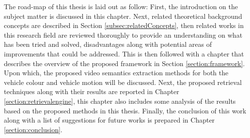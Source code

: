 The road-map of this thesis is laid out as follow: First, the introduction on the subject matter is discussed in this chapter. Next, related theoretical background concepts are described in Section \ref{subsec:relatedConcepts}, then related works in this research field are reviewed thoroughly to provide an understanding on what has been tried and solved, disadvantages along with potential areas of improvements that could be addressed. This is then followed with a chapter that describes the overview of the proposed framework in Section \ref{section:framework}. Upon which, the proposed video semantics extraction methods for both the vehicle colour and vehicle motion will be discussed. Next, the proposed retrieval techniques along with their results are reported in Chapter \ref{section:retrievalengine}, this chapter also includes some analysis of the results based on the proposed methods in this thesis. Finally, the conclusion of this work along with a list of suggestions for future works is prepared in Chapter \ref{section:conclusion}.
